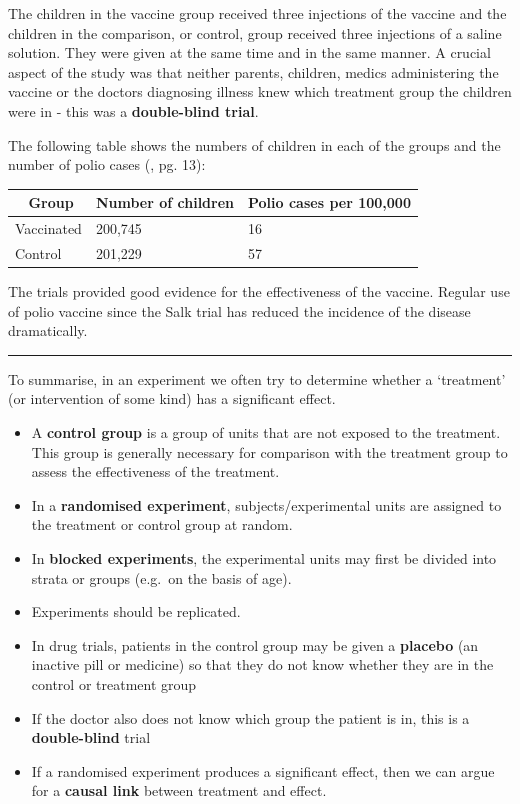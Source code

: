\documentclass[
  oneside]{krantz}
\begin{document}
The children in the vaccine group received three injections of the vaccine and the children in the comparison, or control, group received three injections of a saline solution. They were given at the same time and in the same manner.
A crucial aspect of the study was that neither parents, children, medics administering the vaccine or the doctors diagnosing illness knew which treatment group the children were in - this was a \textbf{double-blind trial}.

The following table shows the numbers of children in each of the groups and the number of polio cases (\citep{Snedecor&Cochran1980}, pg. 13):

\begin{longtable}[]{@{}lll@{}}
\toprule
~ Group & Number of children & Polio cases per 100,000\tabularnewline
\midrule
\endhead
Vaccinated & 200,745 & 16\tabularnewline
Control & 201,229 & 57\tabularnewline
\bottomrule
\end{longtable}

The trials provided good evidence for the effectiveness of the vaccine. Regular use of polio vaccine since the Salk trial has reduced the incidence of the disease dramatically.

\begin{center}\rule{0.5\linewidth}{0.5pt}\end{center}

To summarise, in an experiment we often try to determine whether a `treatment' (or intervention of some kind) has a significant effect.

\begin{itemize}
\item
  A \textbf{control group} is a group of units that are not exposed to the treatment. This group is generally necessary for comparison with the treatment group to assess the effectiveness of the treatment.
\item
  In a \textbf{randomised experiment}, subjects/experimental units are assigned to the treatment or control group at random.
\item
  In \textbf{blocked experiments}, the experimental units may first be divided into strata or groups (e.g.~on the basis of age).
\item
  Experiments should be replicated.
\item
  In drug trials, patients in the control group may be given a \textbf{placebo} (an inactive pill or medicine) so that they do not know whether they are in the control or treatment group
\item
  If the doctor also does not know which group the patient is in, this is a \textbf{double-blind} trial
\item
  If a randomised experiment produces a significant effect, then we can argue for a \textbf{causal link} between treatment and effect.
\end{itemize}
\end{document}
